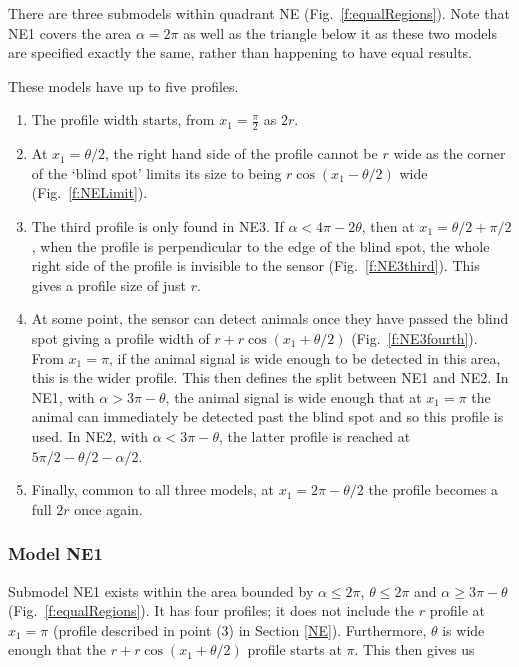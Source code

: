 There are three submodels within quadrant NE (Fig.~\ref{f:equalRegions}). Note that NE1 covers the area $\alpha=2\pi$ as well as the triangle below it as these two models are specified exactly the same, rather than happening to have equal results.

These models have up to five profiles.

\begin{enumerate}
\item The profile width starts, from $x_1=\frac{\pi}{2}$ as $2r$. 
\item At $x_1 = \theta/2$, the right hand side of the profile cannot be $r$ wide as the corner of the `blind spot' limits its size to being $r\cos(x_1 - \theta/2)$ wide (Fig.~\ref{f:NELimit}). 

\item The third profile is only found in NE3. If $\alpha < 4\pi - 2\theta$, then at $x_1=\theta/2 + \pi/2$, when the profile is perpendicular to the edge of the blind spot, the whole right side of the profile is invisible to the sensor (Fig.~\ref{f:NE3third}). This gives a profile size of just $r$.

\item At some point, the sensor can detect animals once they have passed the blind spot giving a profile width of $r + r\cos(x_1 + \theta/2)$ (Fig.~\ref{f:NE3fourth}). From $x_1=\pi$, if the animal signal is wide enough to be detected in this area, this is the wider profile. This then defines the split between NE1 and NE2. In NE1, with $\alpha > 3\pi - \theta$, the animal signal is wide enough that at $x_1=\pi$ the animal can immediately be detected past the blind spot and so this profile is used. In NE2, with $\alpha < 3\pi - \theta$, the latter profile is reached at $5\pi/2 - \theta/2 - \alpha/2$. 

\item Finally, common to all three models, at $x_1 = 2\pi - \theta/2$ the profile becomes a full $2r$ once again. \label{NElist5}
\end{enumerate}



\subsubsection{Model NE1} \label{NE1}

Submodel NE1 exists within the area bounded by $\alpha\le2\pi$, $\theta\le2\pi$ and $\alpha \ge 3\pi - \theta$ (Fig.~\ref{f:equalRegions}). It has four profiles; it does not include the $r$ profile at $x_1=\pi$ (profile described in point (3) in Section \ref{NE}). Furthermore, $\theta$ is wide enough that the $r + r\cos(x_1 + \theta/2)$ profile starts at $\pi$. This then gives us


